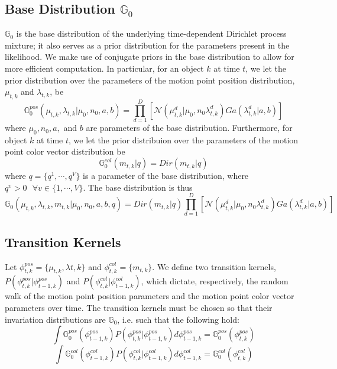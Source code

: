 \documentclass{article}
\begin{document}
\subsection*{Base Distribution $\mathbb{G}_{0}$}
$\mathbb{G}_{0}$ is the base distribution of the underlying time-dependent Dirichlet process mixture; it also serves as a prior distribution for the parameters present in the likelihood. We make use of conjugate priors in the base distribution to allow for more efficient computation. In particular, for an object $k$ at time $t$, we let the prior distribution over the parameters of the motion point position distribution, $\mu_{t, k}$ and $\lambda_{t, k}$, be 
\begin{equation}
\mathbb{G}_{0}^{pos}(\mu_{t, k}, \lambda_{t, k} | \mu_{0}, n_{0}, a, b) = \prod_{d=1}^{D}[\mathcal{N}(\mu_{t, k}^{d} | \mu_{0}, n_{0} \lambda_{t, k}^{d})   Ga(\lambda_{t, k}^{d} | a, b)]
\end{equation}
where $\mu_{0}, n_{0}, a,$ and $b$ are parameters of the base distribution. Furthermore, for object $k$ at time $t$, we let the prior distribuion over the parameters of the motion point color vector distribution be
\begin{equation}
\mathbb{G}_{0}^{col}(m_{t, k} | q) = Dir(m_{t, k} | q)
\end{equation}
where $q = \{ q^{1}, \cdots, q^{V} \}$ is a parameter of the base distribution, where $q^{v}>0 \hspace{8pt} \forall v \in \{ 1, \cdots, V \}$. The base distribution is thus 
\begin{equation}
\mathbb{G}_{0}(\mu_{t, k}, \lambda_{t, k}, m_{t, k} | \mu_{0}, n_{0}, a, b, q) = Dir(m_{t, k} | q)  \prod_{d=1}^{D}[\mathcal{N}(\mu_{t, k}^{d} | \mu_{0}, n_{0} \lambda_{t, k}^{d})   Ga(\lambda_{t, k}^{d} | a, b)]
\end{equation}




\subsection*{Transition Kernels}
Let $\phi_{t,k}^{pos} = \{ \mu_{t, k}, \lambda{t, k} \}$ and $\phi_{t,k}^{col} = \{ m_{t, k} \}$.  We define two transition kernels, $P(\phi_{t, k}^{pos} | \phi_{t-1, k}^{pos})$ and $P(\phi_{t, k}^{col} | \phi_{t-1, k}^{col})$, which dictate, respectively, the random walk of the motion point position parameters and the motion point color vector parameters over time. The transition kernels must be chosen so that their invariation distributions are $\mathbb{G}_{0}$, i.e. such that the following hold:
\begin{equation}
\int \mathbb{G}_{0}^{pos}(\phi_{t-1, k}^{pos}) P(\phi_{t, k}^{pos} | \phi_{t-1, k}^{pos}) d\phi_{t-1, k}^{pos}  =  \mathbb{G}_{0}^{pos}(\phi_{t, k}^{pos})
\end{equation}
\begin{equation}
\int \mathbb{G}_{0}^{col}(\phi_{t-1, k}^{col}) P(\phi_{t, k}^{col} | \phi_{t-1, k}^{col}) d\phi_{t-1, k}^{col}  =  \mathbb{G}_{0}^{col}(\phi_{t, k}^{col})
\end{equation}
\end{document}
